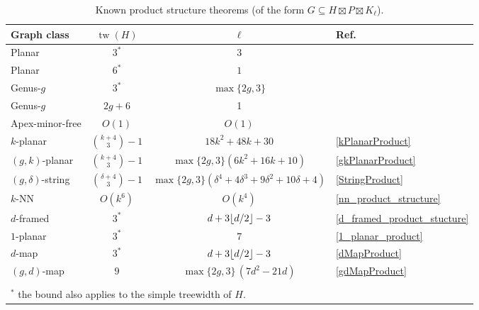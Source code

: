 \documentclass{patmorin}
\theoremstyle{plain}
\theoremstyle{definition}
\DeclareMathOperator{\tw}{tw}
\DeclarePairedDelimiter{\floor}{\lfloor}{\rfloor}
\begin{document}
\begin{table}
  \begin{center}
    \begin{tabular}{lccl}
      \textbf{Graph class} & \boldmath $\tw(H)$ & \boldmath $\ell$ & \textbf{Ref.} \\ \hline\hline
      Planar & $3^*$ & $3$ & \cite{DJMMUW20} \\
      Planar & $6^*$ & $1$ & \cite{UWY} \\
      Genus-$g$ & $3^*$ & $\max\{2g,3\}$ & \cite{DHHW} \\
      Genus-$g$ & $2g+6$ & 1 & \cite{UWY} \\
      Apex-minor-free & $O(1)$ & $O(1)$ & \cite{DJMMUW20} \\[1ex]
      $k$-planar & $\binom{k+4}{3}-1$ & $18k^2 + 48k + 30$ & \cref{kPlanarProduct} \\
      $(g,k)$-planar & $\binom{k+4}{3}-1$ & $\max\{2g,3\}(6k^2+16k+10)$ & \cref{gkPlanarProduct} \\
      $(g,\delta)$-string & $\binom{\delta+4}{3}-1$ & $\max\{2g,3\}(\delta^4 + 4\delta^3 + 9\delta^2 + 10\delta+4)$ & \cref{StringProduct} \\
      $k$-NN & $O(k^6)$ & $O(k^4)$ & \cref{nn_product_structure} \\
      $d$-framed & $3^*$ & $d+ 3\floor{d/2} - 3$ & \cref{d_framed_product_stucture} \\
      $1$-planar & $3^*$ & $7$ & \cref{1_planar_product} \\
      $d$-map & $3^*$ & $d+ 3\floor{d/2} - 3$ & \cref{dMapProduct} \\
      $(g,d)$-map & $9$ & $\max\{2g,3\}\,(7d^2 -21d)$ & \cref{gdMapProduct} \\ \hline
      \\[.2ex]
      \multicolumn{4}{l}{$^*$ the bound also applies to the simple treewidth of $H$.}
    \end{tabular}
  \end{center}
  \caption{Known product structure theorems (of the form $G\subseteq H\boxtimes P\boxtimes K_\ell$).}
  \label{summary_table}
\end{table}
\end{document}
